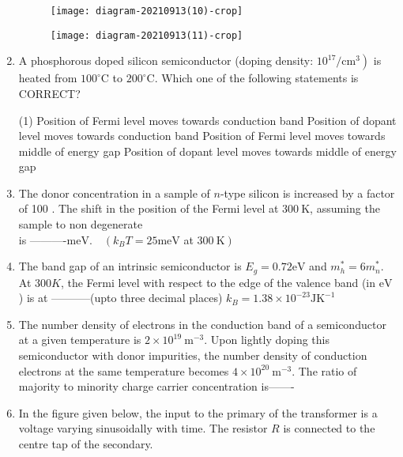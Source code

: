 \begin{enumerate}
\begin{tasks}
\begin{figure}[H]
\end{figure}
\task[\textbf{C.}] \begin{figure}[H]
	\centering
	\texttt{[image: diagram-20210913(10)-crop]}
\end{figure}
\task[\textbf{D.}] \begin{figure}[H]
	\centering
	\texttt{[image: diagram-20210913(11)-crop]}
\end{figure}
\end{tasks}
	\item A phosphorous doped silicon semiconductor (doping density: $\left.10^{17} / \mathrm{cm}^{3}\right)$ is heated from $100^{\circ} \mathrm{C}$ to $200^{\circ} \mathrm{C}$. Which one of the following statements is CORRECT?
{	}
\begin{tasks}(1)
\task[\textbf{A.}] Position of Fermi level moves towards conduction band
\task[\textbf{B.}] Position of dopant level moves towards conduction band
\task[\textbf{C.}] Position of Fermi level moves towards middle of energy gap
\task[\textbf{D.}] Position of dopant level moves towards middle of energy gap
\end{tasks}
	\item The donor concentration in a sample of $n$-type silicon is increased by a factor of 100 . The shift in the position of the Fermi level at $300 \mathrm{~K}$, assuming the sample to non degenerate\\ is ----------$\mathrm{meV} . \quad\left(k_{B} T=25 \mathrm{meV}\right.$ at $\left.300 \mathrm{~K}\right)$
{	}
	\item The band gap of an intrinsic semiconductor is $E_{g}=0.72 \mathrm{eV}$ and $m_{h}^{*}=6 m_{n}^{*} .$ At $300 K$, the Fermi level with respect to the edge of the valence band (in $\mathrm{eV}$ ) is at -----------(upto three decimal places) $k_{B}=1.38 \times 10^{-23} \mathrm{JK}^{-1}$
{	}
	\item The number density of electrons in the conduction band of a semiconductor at a given temperature is $2 \times 10^{19} \mathrm{~m}^{-3}$. Upon lightly doping this semiconductor with donor impurities, the number density of conduction electrons at the same temperature becomes $4 \times 10^{20} \mathrm{~m}^{-3} .$ The ratio of majority to minority charge carrier concentration is-------
{	}
	\item In the figure given below, the input to the primary of the transformer is a voltage varying sinusoidally with time. The resistor $R$ is connected to the centre tap of the secondary.\\

\end{enumerate}
